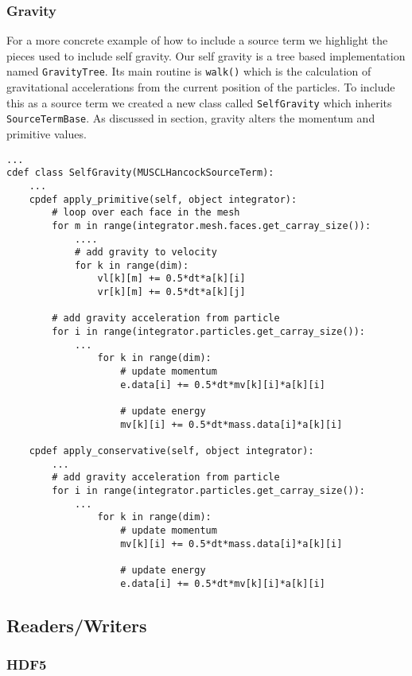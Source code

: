 \subsubsection{Gravity}
For a more concrete example of how to include a source term we highlight the
pieces used to include self gravity. Our self gravity is a tree based implementation
named \lstinline{GravityTree}. Its main routine is \lstinline{walk()} which is the
calculation of gravitational accelerations from the current position of the particles.
To include this as a source term we created a new class called \lstinline{SelfGravity}
which inherits \lstinline{SourceTermBase}. As discussed in section, gravity alters
the momentum and primitive values.
\begin{lstlisting}
...
cdef class SelfGravity(MUSCLHancockSourceTerm):
    ...
    cpdef apply_primitive(self, object integrator):
        # loop over each face in the mesh 
        for m in range(integrator.mesh.faces.get_carray_size()):
            ....
            # add gravity to velocity
            for k in range(dim):
                vl[k][m] += 0.5*dt*a[k][i]
                vr[k][m] += 0.5*dt*a[k][j]

        # add gravity acceleration from particle
        for i in range(integrator.particles.get_carray_size()):
            ...
                for k in range(dim):
                    # update momentum
                    e.data[i] += 0.5*dt*mv[k][i]*a[k][i]

                    # update energy 
                    mv[k][i] += 0.5*dt*mass.data[i]*a[k][i]

    cpdef apply_conservative(self, object integrator):
        ...
        # add gravity acceleration from particle
        for i in range(integrator.particles.get_carray_size()):
            ...
                for k in range(dim):
                    # update momentum
                    mv[k][i] += 0.5*dt*mass.data[i]*a[k][i]

                    # update energy 
                    e.data[i] += 0.5*dt*mv[k][i]*a[k][i]
\end{lstlisting}

\subsection{Readers/Writers}
\subsubsection{HDF5}

